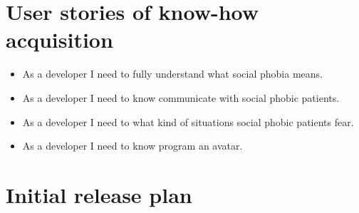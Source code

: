 \section{User stories of know-how acquisition}
\begin{itemize}
\item As a developer I need to fully understand what social phobia means.
\item As a developer I need to know communicate with social phobic patients.
\item As a developer I need to what kind of situations social phobic patients fear.
\item As a developer I need to know program an avatar.
\end{itemize}
\section{Initial release plan}